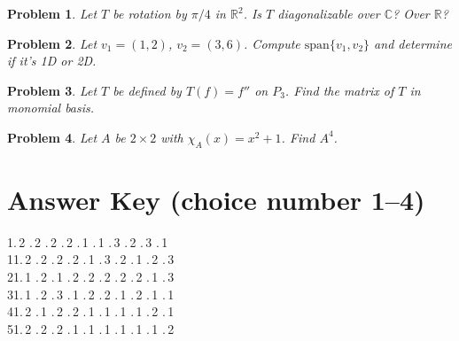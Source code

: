 \documentclass[11pt]{article}
\theoremstyle{upright}
\newtheorem{problem}{Problem}
\begin{document}
\begin{problem}
Let $T$ be rotation by $\pi/4$ in $\mathbb{R}^2$. Is $T$ diagonalizable over $\mathbb{C}$? Over $\mathbb{R}$?
\end{problem}

\begin{problem}
Let $v_1 = (1,2)$, $v_2 = (3,6)$. Compute $\mathrm{span}\{v_1,v_2\}$ and determine if it's 1D or 2D.
\end{problem}

\begin{problem}
Let $T$ be defined by $T(f) = f''$ on $P_3$. Find the matrix of $T$ in monomial basis.
\end{problem}

\begin{problem}
Let $A$ be $2\times 2$ with $\chi_A(x) = x^2 + 1$. Find $A^4$.
\end{problem}
\section*{Answer Key (choice number 1–4)}
\begin{flushleft}
1.\,2 .\,2 .\,2 .\,2 .\,1 .\,1 .\,3 .\,2 .\,3 .\,1\\
11.\,2 .\,2 .\,2 .\,2 .\,1 .\,3 .\,2 .\,1 .\,2 .\,3\\
21.\,1 .\,2 .\,1 .\,2 .\,2 .\,2 .\,2 .\,2 .\,1 .\,3\\
31.\,1 .\,2 .\,3 .\,1 .\,2 .\,2 .\,1 .\,2 .\,1 .\,1\\
41.\,2 .\,1 .\,2 .\,2 .\,1 .\,1 .\,1 .\,1 .\,2 .\,1\\
51.\,2 .\,2 .\,2 .\,1 .\,1 .\,1 .\,1 .\,1 .\,1 .\,2
\end{flushleft}
\end{document}
